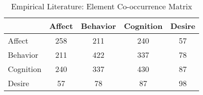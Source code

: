 \begin{table}
\begin{minipage}[t][\textheight][t]{\textwidth}

\caption{\label{tab:EmpiricalElementCooccurrences}Empirical Literature: Element Co-occurrence Matrix}
\begin{tabular}[t]{lcccc}
\toprule
  & Affect & Behavior & Cognition & Desire\\
\midrule
Affect & 258 & 211 & 240 & 57\\
Behavior & 211 & 422 & 337 & 78\\
Cognition & 240 & 337 & 430 & 87\\
Desire & 57 & 78 & 87 & 98\\
\bottomrule
\end{tabular}
\end{minipage}
\end{table}
